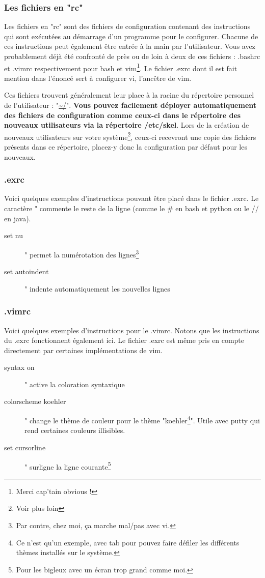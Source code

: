 \documentclass[a4paper,11pt]{article}
\begin{document}
\subsubsection{Les fichiers en "rc"}
\par Les fichiers en "rc" sont des fichiers de configuration contenant des instructions qui sont exécutées au démarrage d'un programme pour le configurer. Chacune de ces instructions peut également être entrée à la main par l'utilisateur. Vous avez probablement déjà été confronté de près ou de loin à deux de ces fichiers : .bashrc et .vimrc respectivement pour bash et vim\footnote{Merci cap'tain obvious !}. Le fichier .exrc dont il est fait mention dans l'énoncé sert à configurer vi, l'ancêtre de vim.
\par Ces fichiers trouvent généralement leur place à la racine du répertoire personnel de l'utilisateur : "\url{~/}". \textbf{Vous pouvez facilement déployer automatiquement des fichiers de configuration comme ceux-ci dans le répertoire des nouveaux utilisateurs via la répertoire /etc/skel}. Lors de la création de nouveaux utilisateurs sur votre système\footnote{Voir plus loin}, ceux-ci recevront une copie des fichiers présents dans ce répertoire, placez-y donc la configuration par défaut pour les nouveaux.
\subsubsection{.exrc}
\par Voici quelques exemples d'instructions pouvant être placé dans le fichier .exrc. Le caractère " commente le reste de la ligne (comme le \# en bash et python ou le // en java).
\begin{description}
  \item[set nu] " permet la numérotation des lignes\footnote{Par contre, chez moi, ça marche mal/pas avec vi.}
  \item[set autoindent] " indente automatiquement les nouvelles lignes
\end{description}

\subsubsection{.vimrc}
\par Voici quelques exemples d'instructions pour le .vimrc. Notons que les instructions du .exrc fonctionnent également ici. Le fichier .exrc est même pris en compte directement par certaines implémentations de vim.
\begin{description}
  \item[syntax on] " active la coloration syntaxique
  \item[colorscheme koehler] " change le thème de couleur pour le thème "koehler\footnote{Ce n'est qu'un exemple, avec tab pour pouvez faire défiler les différents thèmes installés sur le système.}". Utile avec putty qui rend certaines couleurs illisibles.
  \item[set cursorline] " surligne la ligne courante\footnote{Pour les bigleux avec un écran trop grand comme moi.}
\end{description}
\end{document}
